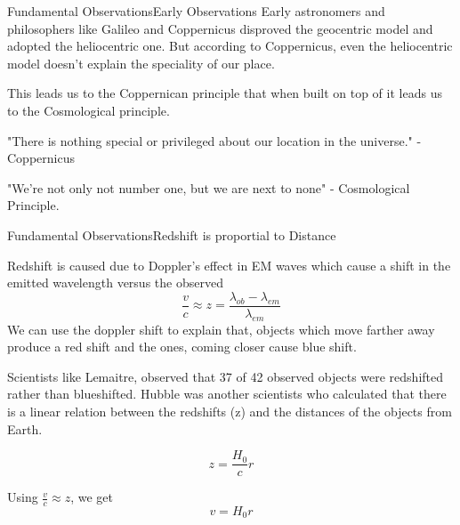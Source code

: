 \begin{frame}{Fundamental Observations}{Early Observations}
    Early astronomers and philosophers like Galileo and Coppernicus disproved the
    geocentric model and adopted the heliocentric one. But according to
    Coppernicus, even the heliocentric model doesn't explain the speciality of
    our place.

    This leads us to the Coppernican principle that when built on top of it
    leads us to the Cosmological principle.

    "There is nothing special or privileged about our location in the
    universe." - Coppernicus

    "We're not only not number one, but we are next to none" - Cosmological
    Principle.
\end{frame}


\begin{frame}{Fundamental Observations}{Redshift is proportial to Distance}

Redshift is caused due to Doppler's effect in EM waves which cause a shift in
the emitted wavelength versus the observed
$$ \frac{v}{c} \approx z = \frac{\lambda_{ob} - \lambda_{em}}{\lambda_{em}} $$
We can use the doppler shift to explain that, objects which move farther away
produce a red shift and the ones, coming closer cause blue shift.

Scientists like Lemaitre, observed that 37 of 42 observed objects were
redshifted rather than blueshifted. Hubble was another scientists who calculated
that there is a linear relation between the redshifts (z) and the distances of
the objects from Earth.

$$ z = \frac{H_0}{c} r $$

Using $ \frac{v}{c} \approx z $, we get
$$ v = H_0r  $$


\end{frame}

